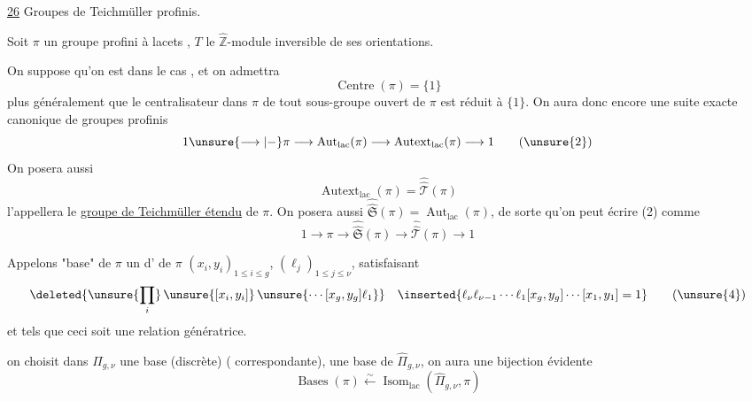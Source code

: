 

\uline{26} Groupes de Teichmüller profinis.


Soit $\pi$ un groupe profini à lacets , $T$ le $\widehat{\mathbb Z}$-module inversible de ses orientations.

On suppose qu'on est dans le cas , et on admettra 
\[
\operatorname{Centre}(\pi)=\{1\}
\tag{1}
\]
plus généralement que le centralisateur dans $\pi$ de tout sous-groupe ouvert de $\pi$ est réduit à $\{1\}$. On aura donc encore une suite exacte canonique de groupes profinis
\[
1 \unsure{\longrightarrow|{-}} \pi \longrightarrow \operatorname{Aut}_{\mathrm{lac}}(\pi) \longrightarrow \operatorname{Autext}_{\mathrm{lac}}(\pi) \longrightarrow 1
\tag{\unsure{2}}
\]
On posera aussi 
\[
\operatorname{Autext}_{\mathrm{lac}}(\pi)=\widehat{\widehat{\mathcal T}}(\pi)
\tag{3}
\]
 l'appellera le \uline{groupe de Teichmüller étendu} de $\pi$. On posera aussi $\widehat{\widehat{\mathfrak S}}(\pi)=\operatorname{Aut}_{\mathrm{lac}}(\pi)$, de sorte qu'on peut écrire (2) comme
\[
1 \longrightarrow \pi \longrightarrow \widehat{\widehat{\mathfrak S}}(\pi) \longrightarrow \widehat{\widehat{\mathcal T}}(\pi) \longrightarrow 1
\tag{2'}
\]

Appelons "base" de $\pi$ un  d' de $\pi$ $(x_i,y_i)_{1\leq i\leq g}$, $(\ell_j)_{1\leq j\leq\nu}$,  satisfaisant
\[
\deleted{\unsure{\prod_i}\,\unsure{[x_i,y_i]}\,\unsure{\cdots[x_g,y_g]\ell_1}}
\quad
\inserted{\ell_\nu\ell_{\nu-1}\cdots\ell_1[x_g,y_g]\cdots[x_1,y_1]=1}
\tag{\unsure{4}}
\]
et tels que ceci soit une relation génératrice.




 on choisit dans $\Pi_{g,\nu}$ une base (discrète) ( correspondante),  une base de $\widehat{\Pi}_{g,\nu}$, on aura une bijection évidente
\[
\operatorname{Bases}(\pi) \xleftarrow{\sim} \operatorname{Isom}_{\mathrm{lac}}(\widehat{\Pi}_{g,\nu},\pi)
\tag{5}
\]

